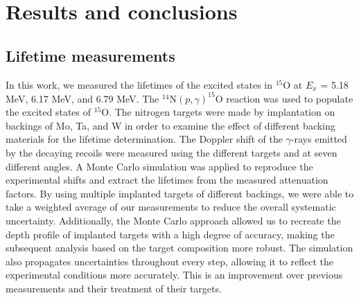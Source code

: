 %
%
%
%
%
%
%
%
%
%


%
%

\chapter{Results and conclusions}
\label{chap: conclusions}



\section{Lifetime measurements}
\label{sec: resultsLifetime}

In this work, we measured the lifetimes of the excited states in $^{15}$O at $E_{x}$ = 5.18 MeV, 6.17 MeV, and 6.79 MeV. The $^{14}$N$(p,\gamma)^{15}$O reaction was used to populate the excited states of $^{15}$O. The nitrogen targets were made by implantation on backings of Mo, Ta, and W in order to examine the effect of different backing materials for the lifetime determination. The Doppler shift of the $\gamma$-rays emitted by the decaying recoils were measured using the different targets and at seven different angles. A Monte Carlo simulation was applied to reproduce the experimental shifts and extract the lifetimes from the measured attenuation factors. By using multiple implanted targets of different backings, we were able to take a weighted average of our measurements to reduce the overall systematic uncertainty. Additionally, the Monte Carlo approach allowed us to recreate the depth profile of implanted targets with a high degree of accuracy, making the subsequent analysis based on the target composition more robust. The simulation also propagates uncertainties throughout every step, allowing it to reflect the experimental conditions more accurately. This is an improvement over previous measurements and their treatment of their targets.


